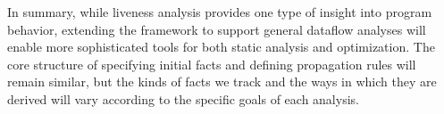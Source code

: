 \documentclass{article}
\begin{document}
In summary, while liveness analysis provides one type of insight into program behavior, extending the framework to support general dataflow analyses will enable more sophisticated tools for both static analysis and optimization. The core structure of specifying initial facts and defining propagation rules will remain similar, but the kinds of facts we track and the ways in which they are derived will vary according to the specific goals of each analysis.
\end{document}
